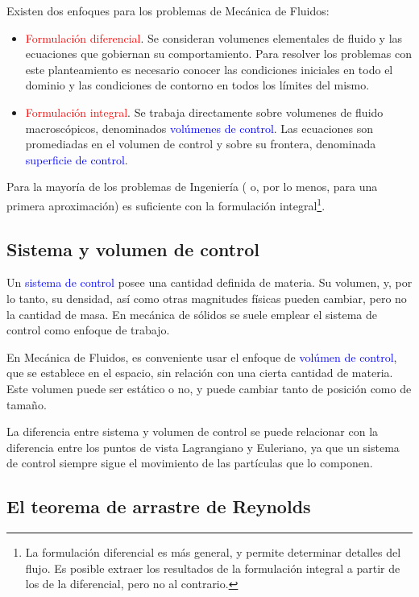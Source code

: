 	
	Existen dos enfoques para los problemas de Mecánica de Fluidos: 
	\begin{itemize}
		\item \textcolor{red}{Formulación diferencial}. Se consideran volumenes
		elementales de fluido y las ecuaciones que gobiernan su comportamiento.
		Para resolver los problemas con este planteamiento es necesario conocer
		las condiciones iniciales en todo el dominio y las condiciones de
		contorno en todos los límites del mismo. 
		\item \textcolor{red}{Formulación integral}. Se trabaja directamente sobre
		volumenes de fluido macroscópicos, denominados \textcolor{blue}{volúmenes
			de control}. Las ecuaciones son promediadas en el volumen de control
		y sobre su frontera, denominada \textcolor{blue}{superficie de control}. 
	\end{itemize}
	Para la mayoría de los problemas de Ingeniería ( o, por lo menos,
	para una primera aproximación) es suficiente con la formulación integral\footnote{La formulación diferencial es
		más general, y permite determinar detalles del flujo. Es posible extraer
		los resultados de la formulación integral a partir de los de la diferencial,
		pero no al contrario.}.


\subsection{Sistema y volumen de control}

	
	Un \textcolor{blue}{sistema de control} posee una cantidad definida
	de materia. Su volumen, y, por lo tanto, su densidad, así como otras
	magnitudes físicas pueden cambiar, pero no la cantidad de masa. En
	mecánica de sólidos se suele emplear el sistema de control como enfoque
	de trabajo.
	
	En Mecánica de Fluidos, es conveniente usar el enfoque de \textcolor{blue}{volúmen
		de control}, que se establece en el espacio, sin relación con una
	cierta cantidad de materia. Este volumen puede ser estático o no,
	y puede cambiar tanto de posición como de tamaño.
	
	La diferencia entre sistema y volumen de control se puede relacionar
	con la diferencia entre los puntos de vista Lagrangiano y Euleriano,
	ya que un sistema de control siempre sigue el movimiento de las partículas
	que lo componen.


\subsection{El teorema de arrastre de Reynolds}

